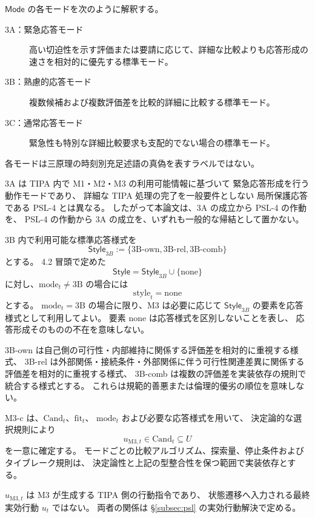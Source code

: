 \begin{definition}
\label{def:M3_modes}
$\mathsf{Mode}$ の各モードを次のように解釈する。
\begin{description}
  \item[3A：緊急応答モード]
  高い切迫性を示す評価または要請に応じて、詳細な比較よりも応答形成の速さを相対的に優先する標準モード。
  \item[3B：熟慮的応答モード]
  複数候補および複数評価差を比較的詳細に比較する標準モード。
  \item[3C：通常応答モード]
  緊急性も特別な詳細比較要求も支配的でない場合の標準モード。
\end{description}
各モードは三原理の時刻別充足述語の真偽を表すラベルではない。
\end{definition}

\begin{remark}
\label{rem:m3_3a_vs_psl4}
3A は TIPA 内で M1・M2・M3 の利用可能情報に基づいて
緊急応答形成を行う動作モードであり、
詳細な TIPA 処理の完了を一般要件としない
局所保護応答である PSL-4 とは異なる。
したがって本論文は、3A の成立から PSL-4 の作動を、
PSL-4 の作動から 3A の成立を、いずれも一般的な帰結として置かない。
\end{remark}

\begin{definition}
\label{def:m3_3b_styles}
3B 内で利用可能な標準応答様式を
\[
  \mathsf{Style}_{3B}
  :=
  \{\mathrm{3B\mbox{-}own},\mathrm{3B\mbox{-}rel},\mathrm{3B\mbox{-}comb}\}
\]
とする。
4.2 冒頭で定めた
\[
  \mathsf{Style}
  =
  \mathsf{Style}_{3B}\cup\{\mathrm{none}\}
\]
に対し、$\mathrm{mode}_t\neq\mathrm{3B}$ の場合には
\[
  \mathrm{style}_t=\mathrm{none}
\]
とする。
$\mathrm{mode}_t=\mathrm{3B}$ の場合に限り、M3 は必要に応じて
$\mathsf{Style}_{3B}$ の要素を応答様式として利用してよい。
要素 $\mathrm{none}$ は応答様式を区別しないことを表し、
応答形成そのものの不在を意味しない。

3B-own は自己側の可行性・内部維持に関係する評価差を相対的に重視する様式、
3B-rel は外部関係・接続条件・外部関係に伴う可行性関連差異に関係する評価差を相対的に重視する様式、
3B-comb は複数の評価差を実装依存の規則で統合する様式とする。
これらは規範的善悪または倫理的優劣の順位を意味しない。
\end{definition}

\begin{definition}
\label{def:action_decision}
M3-c は、$\mathrm{Cand}_t$、$\mathrm{fit}_t$、
$\mathrm{mode}_t$ および必要な応答様式を用いて、
決定論的な選択規則により
\[
  u_{\mathrm{M3},t}\in\mathrm{Cand}_t\subseteq U
\]
を一意に確定する。
モードごとの比較アルゴリズム、探索量、停止条件およびタイブレーク規則は、
決定論性と上記の型整合性を保つ範囲で実装依存とする。

$u_{\mathrm{M3},t}$ は M3 が生成する TIPA 側の行動指令であり、
状態遷移へ入力される最終実効行動 $u_t$ ではない。
両者の関係は \S\ref{subsec:psl} の実効行動解決で定める。
\end{definition}

